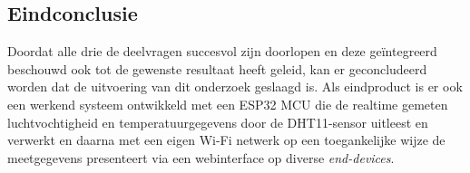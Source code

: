 \subsection{Eindconclusie}
Doordat alle drie de deelvragen succesvol zijn doorlopen en deze geïntegreerd beschouwd ook tot de gewenste resultaat heeft geleid, kan er geconcludeerd worden 
dat de uitvoering van dit onderzoek geslaagd is. Als eindproduct is er ook een werkend systeem ontwikkeld met een ESP32 MCU 
die de realtime gemeten luchtvochtigheid en temperatuurgegevens door de DHT11-sensor 
 uitleest en verwerkt en daarna met een eigen Wi-Fi netwerk op een toegankelijke wijze de meetgegevens  
presenteert via een webinterface op diverse \textit{end-devices}.
